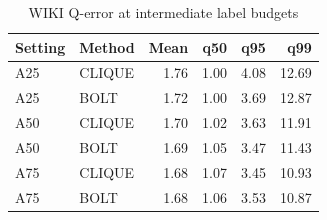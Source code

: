 \begin{table}[H]
\centering
\small
\setlength{\tabcolsep}{5pt}
\caption{WIKI Q-error at intermediate label budgets}
\label{tab:supplement-WIKI}
\begin{tabular}{@{}llrrrr@{}}
\toprule
Setting & Method & Mean & q50 & q95 & q99 \\
\midrule
A25 & CLIQUE & 1.76 & 1.00 & 4.08 & 12.69 \\
A25 & BOLT & 1.72 & 1.00 & 3.69 & 12.87 \\
A50 & CLIQUE & 1.70 & 1.02 & 3.63 & 11.91 \\
A50 & BOLT & 1.69 & 1.05 & 3.47 & 11.43 \\
A75 & CLIQUE & 1.68 & 1.07 & 3.45 & 10.93 \\
A75 & BOLT & 1.68 & 1.06 & 3.53 & 10.87 \\
\bottomrule
\end{tabular}
\end{table}
